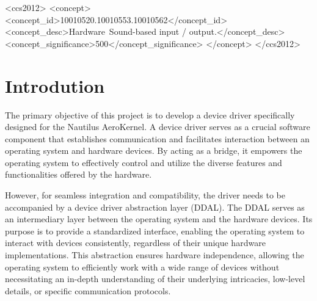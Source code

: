 \documentclass[sigplan,screen]{acmart}
\begin{document}
\begin{CCSXML}
<ccs2012>
 <concept>
  <concept_id>10010520.10010553.10010562</concept_id>
  <concept_desc>Hardware~Sound-based input / output.</concept_desc>
  <concept_significance>500</concept_significance>
 </concept>
</ccs2012>
\end{CCSXML}






\maketitle

\section{Introdution}
The primary objective of this project is to develop a device driver specifically designed for the Nautilus AeroKernel. A device driver serves as a crucial software component that establishes communication and facilitates interaction between an operating system and hardware devices. By acting as a bridge, it empowers the operating system to effectively control and utilize the diverse features and functionalities offered by the hardware.

However, for seamless integration and compatibility, the driver needs to be accompanied by a device driver abstraction layer (DDAL). The DDAL serves as an intermediary layer between the operating system and the hardware devices. Its purpose is to provide a standardized interface, enabling the operating system to interact with devices consistently, regardless of their unique hardware implementations. This abstraction ensures hardware independence, allowing the operating system to efficiently work with a wide range of devices without necessitating an in-depth understanding of their underlying intricacies, low-level details, or specific communication protocols.
\end{document}
